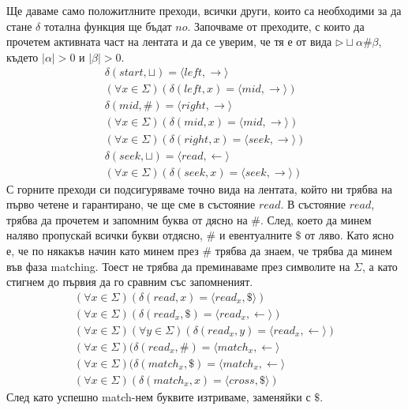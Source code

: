 \documentclass[14pt]{extarticle}
\begin{document}
Ще даваме само положитлните преходи, всички други, които са необходими за да стане \(\delta\) тотална функция ще бъдат \(no\).
Започваме от преходите, с които да прочетем активната част на лентата и да се уверим, че тя е от вида \(\triangleright\sqcup\alpha\#\beta\), където \(|\alpha| > 0\) и \(|\beta| > 0\).
\begin{align*}
    \delta(start, \sqcup) = \langle left, \rightarrow \rangle \\
    (\forall x \in \Sigma)(\delta(left, x) = \langle mid, \rightarrow \rangle)\\
    \delta(mid, \#) = \langle right, \rightarrow \rangle \\
    (\forall x \in \Sigma)(\delta(mid, x) = \langle mid, \rightarrow \rangle) \\
    (\forall x \in \Sigma)(\delta(right, x) = \langle seek, \rightarrow \rangle) \\
    \delta(seek, \sqcup) = \langle read, \leftarrow \rangle \\
    (\forall x \in \Sigma)(\delta(seek, x) = \langle seek, \rightarrow \rangle)
\end{align*}
С горните преходи си подсигуряваме точно вида на лентата, който ни трябва на първо четене и гарантирано, че ще сме в състояние \(read\). В състояние \(read\), трябва да прочетем и запомним буква от дясно на \(\#\).
След, което да минем наляво пропускай всички букви отдясно, \(\#\) и евентуалните \(\$\) от ляво.
Като ясно е, че по някакъв начин като минем през \(\#\) трябва да знаем, че трябва да минем във фаза matching.
Тоест не трябва да преминаваме през символите на \(\Sigma\), а като стигнем до първия да го сравним със запомненият.
\begin{align*}
    (\forall x \in \Sigma)(\delta(read, x) = \langle read_x, \$ \rangle) \\
    (\forall x \in \Sigma)(\delta(read_x, \$) = \langle read_x, \leftarrow \rangle) \\
    (\forall x \in \Sigma)(\forall y \in \Sigma)(\delta(read_x, y) = \langle read_x, \leftarrow \rangle)\\
    (\forall x \in \Sigma)(\delta(read_x, \#) = \langle match_x, \leftarrow \rangle \\
    (\forall x \in \Sigma)(\delta(match_x, \$) = \langle match_x, \leftarrow \rangle \\
    (\forall x \in \Sigma)(\delta(match_x, x) = \langle cross, \$ \rangle)
\end{align*}
След като успешно match-нем буквите изтриваме, заменяйки с \(\$\).
\end{document}

